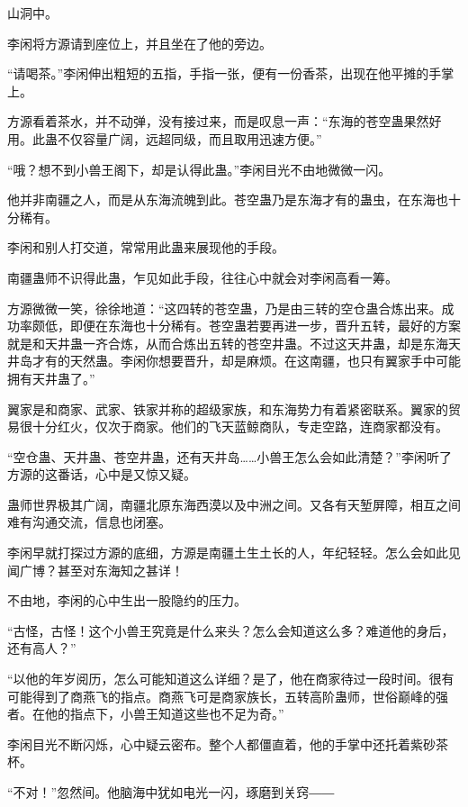
\begin{this_body}

山洞中。

李闲将方源请到座位上，并且坐在了他的旁边。

“请喝茶。”李闲伸出粗短的五指，手指一张，便有一份香茶，出现在他平摊的手掌上。

方源看着茶水，并不动弹，没有接过来，而是叹息一声：“东海的苍空蛊果然好用。此蛊不仅容量广阔，远超同级，而且取用迅速方便。”

“哦？想不到小兽王阁下，却是认得此蛊。”李闲目光不由地微微一闪。

他并非南疆之人，而是从东海流魄到此。苍空蛊乃是东海才有的蛊虫，在东海也十分稀有。

李闲和别人打交道，常常用此蛊来展现他的手段。

南疆蛊师不识得此蛊，乍见如此手段，往往心中就会对李闲高看一筹。

方源微微一笑，徐徐地道：“这四转的苍空蛊，乃是由三转的空仓蛊合炼出来。成功率颇低，即便在东海也十分稀有。苍空蛊若要再进一步，晋升五转，最好的方案就是和天井蛊一齐合炼，从而合炼出五转的苍空井蛊。不过这天井蛊，却是东海天井岛才有的天然蛊。李闲你想要晋升，却是麻烦。在这南疆，也只有翼家手中可能拥有天井蛊了。”

翼家是和商家、武家、铁家并称的超级家族，和东海势力有着紧密联系。翼家的贸易很十分红火，仅次于商家。他们的飞天蓝鲸商队，专走空路，连商家都没有。

“空仓蛊、天井蛊、苍空井蛊，还有天井岛……小兽王怎么会如此清楚？”李闲听了方源的这番话，心中是又惊又疑。

蛊师世界极其广阔，南疆北原东海西漠以及中洲之间。又各有天堑屏障，相互之间难有沟通交流，信息也闭塞。

李闲早就打探过方源的底细，方源是南疆土生土长的人，年纪轻轻。怎么会如此见闻广博？甚至对东海知之甚详！

不由地，李闲的心中生出一股隐约的压力。

“古怪，古怪！这个小兽王究竟是什么来头？怎么会知道这么多？难道他的身后，还有高人？”

“以他的年岁阅历，怎么可能知道这么详细？是了，他在商家待过一段时间。很有可能得到了商燕飞的指点。商燕飞可是商家族长，五转高阶蛊师，世俗巅峰的强者。在他的指点下，小兽王知道这些也不足为奇。”

李闲目光不断闪烁，心中疑云密布。整个人都僵直着，他的手掌中还托着紫砂茶杯。

“不对！”忽然间。他脑海中犹如电光一闪，琢磨到关窍――


\end{this_body}
